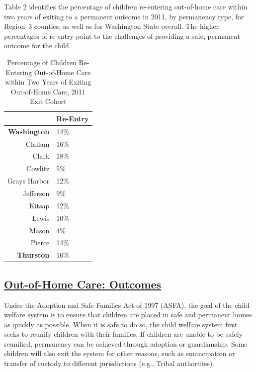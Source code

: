 \documentclass{article}\usepackage[]{graphicx}\usepackage[]{color}
\begin{document}
Table 2 identifies the percentage of children re-entering out-of-home care within two years of exiting to a permanent outcome in 2011, by permanency type, for Region~3 counties, as well as for Washington State overall. The higher percentages of re-entry point to the challenges of providing a safe, permanent outcome for the child.
\vspace{12pt}
\nopagebreak[3]
\begin{table}[ht]
\centering
\caption{Percentage of Children Re-Entering Out-of-Home Care within Two Years of Exiting Out-of-Home Care, 2011 Exit Cohort} 
\begin{tabular}{rl}
  \toprule
 &  Re-Entry \\ 
  \midrule
\textbf{Washington} & 14\% \\ 
  Clallam & 16\% \\ 
  Clark & 18\% \\ 
  Cowlitz & 5\% \\ 
  Grays Harbor & 12\% \\ 
  Jefferson & 9\% \\ 
  Kitsap & 12\% \\ 
  Lewis & 10\% \\ 
  Mason & 4\% \\ 
  Pierce & 14\% \\ 
  \textbf{Thurston} & 16\% \\ 
   \bottomrule
\end{tabular}
\end{table}


\newpage

\subsection{\href{http://www.partnersforourchildren.org/data-portal/visualizations/out-home-care/outcomes}
    {Out-of-Home Care: Outcomes}
}
Under the Adoption and Safe Families Act of 1997 (ASFA), the goal of the child welfare system is to ensure that children are placed in safe and permanent homes as quickly as possible. When it is safe to do so, the child welfare system first seeks to reunify children with their families. If children are unable to be safely reunified, permanency can be achieved through adoption or guardianship. Some children will also exit the system for other reasons, such as emancipation or transfer of custody to different jurisdictions (e.g., Tribal authorities).
\end{document}
